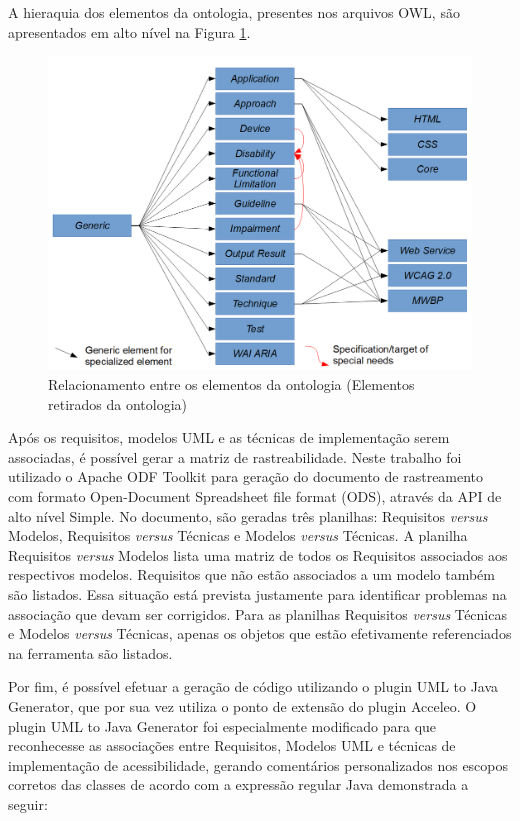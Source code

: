 \documentclass[runningheads,a4paper]{llncs}
\begin{document}
A hieraquia dos elementos da ontologia, presentes nos arquivos OWL, são apresentados em alto nível na Figura \ref{fig:ontologyrelationship}.

\begin{figure}[h]
\centering
\includegraphics[scale=0.3]{./img/ontologyrelationship.png}
\caption{Relacionamento entre os elementos da ontologia (Elementos retirados
da ontologia)}
\label{fig:ontologyrelationship}
\end{figure}

Após os requisitos, modelos UML e as técnicas de implementação serem associadas, é possível gerar a matriz de rastreabilidade.
Neste trabalho foi utilizado o Apache ODF Toolkit para geração do documento de rastreamento com formato Open-Document Spreadsheet file format (ODS), através da API de alto nível Simple. No documento, são geradas três planilhas: Requisitos \textit{versus} Modelos, Requisitos \textit{versus} Técnicas e Modelos \textit{versus} Técnicas. A planilha Requisitos \textit{versus} Modelos lista uma matriz de todos os Requisitos associados aos respectivos modelos. Requisitos que não estão associados a um modelo também são listados. Essa situação está prevista
justamente para identificar problemas na associação que devam ser corrigidos. Para as
planilhas Requisitos \textit{versus} Técnicas e Modelos \textit{versus} Técnicas, apenas os objetos que
estão efetivamente referenciados na ferramenta são listados.

Por fim, é possível efetuar a geração de código utilizando o plugin UML to Java Generator, que por sua vez utiliza o ponto de extensão do plugin Acceleo.
O plugin UML to Java Generator foi especialmente modificado para que reconhecesse as associações entre Requisitos, Modelos UML e técnicas de implementação de acessibilidade, gerando comentários personalizados nos escopos corretos das classes de acordo com a expressão regular Java demonstrada a seguir:
\end{document}
